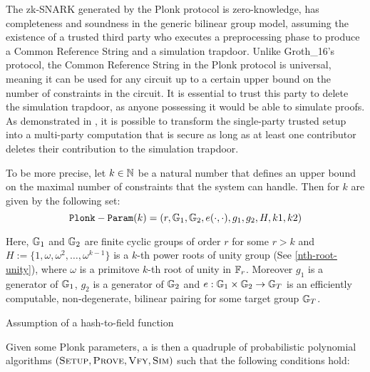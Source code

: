 The zk-SNARK generated by the Plonk protocol is zero-knowledge, has completeness and soundness in the generic bilinear group model, assuming the existence of a trusted third party who executes a preprocessing phase to produce a Common Reference String and a simulation trapdoor. Unlike Groth\_16's protocol, the Common Reference String in the Plonk protocol is universal, meaning it can be used for any circuit up to a certain upper bound on the number of constraints in the circuit. It is essential to trust this party to delete the simulation trapdoor, as anyone possessing it would be able to simulate proofs. As demonstrated in \cite{bowe-17}, it is possible to transform the single-party trusted setup into a multi-party computation that is secure as long as at least one contributor deletes their contribution to the simulation trapdoor. 

To be more precise, let $k\in \mathbb{N}$ be a natural number that defines an upper bound on the maximal number of constraints that the system can handle. Then  for $k$ are given by the following set:
\begin{equation}
\label{groth16-parameters}
\mathtt{Plonk-Param}(k)=(r, \mathbb{G}_1, \mathbb{G}_2, e(\cdot,\cdot), g_1,g_2, H, k1,k2)
\end{equation}

Here, $\mathbb{G}_1$ and $\mathbb{G}_2$ are finite cyclic groups of order $r$ for some $r> k$ and $H:=\{1,\omega,\omega^2,\ldots, \omega^{k-1}\}$ is a $k$-th power roots of unity group (See \ref{nth-root-unity}), where $\omega$ is a primitove $k$-th root of unity in $\mathbb{F}_r$. Moreover $g_1$ is a generator of $\mathbb{G}_1$, $g_2$ is a generator of $\mathbb{G}_2$ and $e: \mathbb{G}_1 \times \mathbb{G}_2 \to \mathbb{G}_T$ is an efficiently computable, non-degenerate, bilinear pairing for some target group $\mathbb{G}_T$. 

Assumption of a hash-to-field function


Given some Plonk parameters, a  is then a quadruple of probabilistic polynomial algorithms $(\textsc{Setup},\textsc{Prove},\textsc{Vfy},\textsc{Sim})$ such that the following conditions hold:

